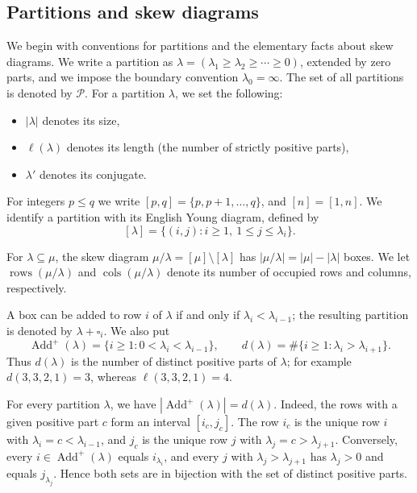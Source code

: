 \documentclass[11pt]{amsart}
\numberwithin{equation}{section}
\theoremstyle{definition}
\theoremstyle{remark}
\newcommand{\Par}{\mathcal P}
\newcommand{\Add}{\operatorname{Add}}
\begin{document}
\subsection{Partitions and skew diagrams}\label{subsec:partitions} 
We begin with conventions for partitions and the elementary facts about skew diagrams. We write a partition as $\lambda=(\lambda_1\geq\lambda_2\geq\cdots\geq0)$, extended by zero parts, and we impose the boundary convention $\lambda_0=\infty$. The set of all partitions is denoted by $\Par$. For a partition $\lambda$, we set the following:
\begin{itemize}
    \item $|\lambda|$ denotes its size,
    \item $\ell(\lambda)$ denotes its length (the number of strictly positive parts),
    \item $\lambda'$ denotes its conjugate.
\end{itemize}
For integers $p\leq q$ we write $[p,q]=\{p,p+1,\dots,q\}$, and
$[n]=[1,n]$. We identify a partition with its English Young diagram, defined by
\[
 [\lambda]=\{(i,j):i\geq1,\ 1\leq j\leq\lambda_i\}.
\]

For $\lambda\subseteq\mu$, the skew diagram $\mu/\lambda=[\mu]\setminus[\lambda]$ has $|\mu/\lambda|=|\mu|-|\lambda|$ boxes. We let $\operatorname{rows}(\mu/\lambda)$ and $\operatorname{cols}(\mu/\lambda)$ denote its number of occupied rows and columns, respectively. 

A box can be added to row $i$ of $\lambda$ if and only if
$\lambda_i<\lambda_{i-1}$; the resulting partition is denoted by
$\lambda+\square_i$. We also put
\begin{equation}\label{eq:Add-def}
 \Add^+(\lambda)=\{i\geq1:0<\lambda_i<\lambda_{i-1}\},
 \qquad
 d(\lambda)=\#\{i\geq1:\lambda_i>\lambda_{i+1}\}.
\end{equation}
Thus $d(\lambda)$ is the number of distinct positive parts of $\lambda$; for
example $d(3,3,2,1)=3$, whereas $\ell(3,3,2,1)=4$.

For every partition $\lambda$, we have
$|\Add^+(\lambda)|=d(\lambda)$. Indeed, the rows with a given positive part $c$ form an interval $[i_c,j_c]$. The
row $i_c$ is the unique row $i$ with $\lambda_i=c<\lambda_{i-1}$, and $j_c$ is
the unique row $j$ with $\lambda_j=c>\lambda_{j+1}$. Conversely, every
$i\in\Add^+(\lambda)$ equals $i_{\lambda_i}$, and every $j$ with
$\lambda_j>\lambda_{j+1}$ has $\lambda_j>0$ and equals $j_{\lambda_j}$. Hence
both sets are in bijection with the set of distinct positive parts.
\end{document}

